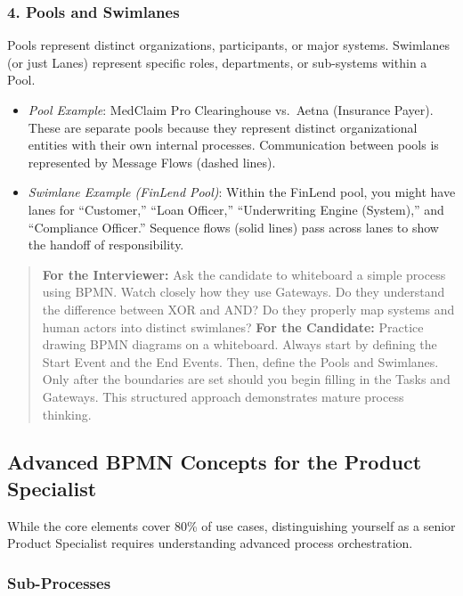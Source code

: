 \subsubsection{4. Pools and Swimlanes}\label{pools-and-swimlanes}

Pools represent distinct organizations, participants, or major systems.
Swimlanes (or just Lanes) represent specific roles, departments, or
sub-systems within a Pool.

\begin{itemize}
\tightlist
\item
  \emph{Pool Example}: MedClaim Pro Clearinghouse vs.~Aetna (Insurance
  Payer). These are separate pools because they represent distinct
  organizational entities with their own internal processes.
  Communication between pools is represented by Message Flows (dashed
  lines).
\item
  \emph{Swimlane Example (FinLend Pool)}: Within the FinLend pool, you
  might have lanes for ``Customer,'' ``Loan Officer,'' ``Underwriting
  Engine (System),'' and ``Compliance Officer.'' Sequence flows (solid
  lines) pass across lanes to show the handoff of responsibility.
\end{itemize}

\begin{quote}
\textbf{For the Interviewer:} Ask the candidate to whiteboard a simple
process using BPMN. Watch closely how they use Gateways. Do they
understand the difference between XOR and AND? Do they properly map
systems and human actors into distinct swimlanes? \textbf{For the
Candidate:} Practice drawing BPMN diagrams on a whiteboard. Always start
by defining the Start Event and the End Events. Then, define the Pools
and Swimlanes. Only after the boundaries are set should you begin
filling in the Tasks and Gateways. This structured approach demonstrates
mature process thinking.
\end{quote}

\subsection{Advanced BPMN Concepts for the Product
Specialist}\label{advanced-bpmn-concepts-for-the-product-specialist}

While the core elements cover 80\% of use cases, distinguishing yourself
as a senior Product Specialist requires understanding advanced process
orchestration.

\subsubsection{Sub-Processes}\label{sub-processes}

